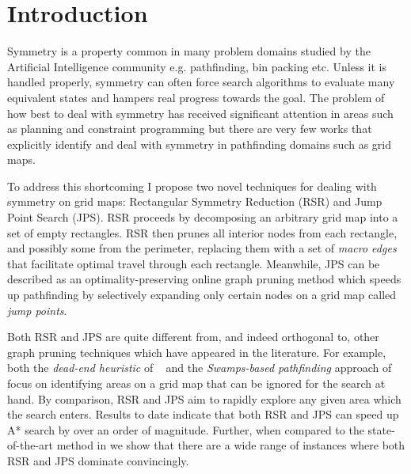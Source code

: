 \section{Introduction}
\label{sec:introduction}
Symmetry is a property common in many problem domains studied by the Artificial
Intelligence community e.g. pathfinding, bin packing etc. 
Unless it is handled properly, symmetry can often force search algorithms
to evaluate many equivalent states and hampers real progress towards the goal.
The problem of how best to deal with symmetry has received significant attention 
in areas such as planning \cite{fox99} and constraint programming \cite{gent00} 
but there are very few works that explicitly identify and deal with symmetry in 
pathfinding domains such as grid maps. 
\par
To address this shortcoming I propose two novel techniques for dealing with 
symmetry on grid maps: Rectangular Symmetry Reduction (RSR) and Jump Point
Search (JPS).
RSR proceeds by decomposing an arbitrary grid map into a set of empty
rectangles. RSR then prunes all interior nodes from each rectangle, and possibly
some from the perimeter, replacing them with a set of \emph{macro edges} that
facilitate optimal travel through each rectangle.  
Meanwhile, JPS can be described as an optimality-preserving online graph
pruning method which speeds up pathfinding by selectively expanding only certain
nodes on a grid map called \emph{jump points}. 
\par
Both RSR and JPS are quite different from, and indeed orthogonal to, other graph
pruning techniques which have appeared in the literature.  For example, both the
\emph{dead-end heuristic} of \citeauthor{bjornsson06} ~
and the \emph{Swamps-based pathfinding} approach of
\citeauthor{pochter10}~ focus on identifying areas on
a grid map that can be ignored for the search at hand.  
By comparison, RSR and JPS
aim to rapidly explore any given area which the search enters.  Results to date
indicate that both RSR and JPS can speed up A* search by over an order of
magnitude.  Further, when compared to the state-of-the-art method in
\cite{pochter10} we show that there are a wide range of instances where both RSR
and JPS dominate convincingly.
